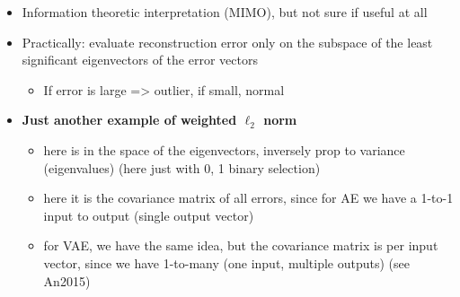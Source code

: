 \documentclass[
  letterpaper,
  DIV=11,
  numbers=noendperiod]{scrartcl}
\providecommand{\tightlist}{%
  \setlength{\itemsep}{0pt}\setlength{\parskip}{0pt}}
\begin{document}
\begin{itemize}
\tightlist
\item
  Information theoretic interpretation (MIMO), but not sure if useful at
  all
\item
  Practically: evaluate reconstruction error only on the subspace of the
  least significant eigenvectors of the error vectors

  \begin{itemize}
  \tightlist
  \item
    If error is large =\textgreater{} outlier, if small, normal
  \end{itemize}
\item
  \textbf{Just another example of weighted \(\ell_2\) norm}

  \begin{itemize}
  \tightlist
  \item
    here is in the space of the eigenvectors, inversely prop to variance
    (eigenvalues) (here just with 0, 1 binary selection)
  \item
    here it is the covariance matrix of all errors, since for AE we have
    a 1-to-1 input to output (single output vector)
  \item
    for VAE, we have the same idea, but the covariance matrix is per
    input vector, since we have 1-to-many (one input, multiple outputs)
    (see An2015)
  \end{itemize}
\end{itemize}
\end{document}
